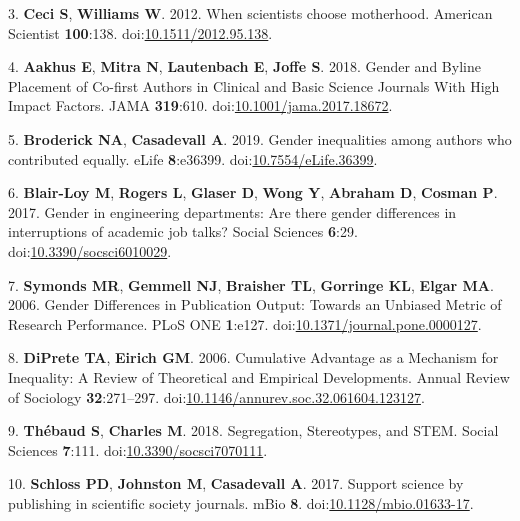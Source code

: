 \documentclass[11pt,]{article}
\begin{document}
\hypertarget{ref-Ceci2012}{}
3. \textbf{Ceci S}, \textbf{Williams W}. 2012. When scientists choose
motherhood. American Scientist \textbf{100}:138.
doi:\href{https://doi.org/10.1511/2012.95.138}{10.1511/2012.95.138}.

\hypertarget{ref-aakhus_gender_2018}{}
4. \textbf{Aakhus E}, \textbf{Mitra N}, \textbf{Lautenbach E},
\textbf{Joffe S}. 2018. Gender and Byline Placement of Co-first Authors
in Clinical and Basic Science Journals With High Impact Factors. JAMA
\textbf{319}:610.
doi:\href{https://doi.org/10.1001/jama.2017.18672}{10.1001/jama.2017.18672}.

\hypertarget{ref-broderick_gender_2019}{}
5. \textbf{Broderick NA}, \textbf{Casadevall A}. 2019. Gender
inequalities among authors who contributed equally. eLife
\textbf{8}:e36399.
doi:\href{https://doi.org/10.7554/eLife.36399}{10.7554/eLife.36399}.

\hypertarget{ref-BlairLoy2017}{}
6. \textbf{Blair-Loy M}, \textbf{Rogers L}, \textbf{Glaser D},
\textbf{Wong Y}, \textbf{Abraham D}, \textbf{Cosman P}. 2017. Gender in
engineering departments: Are there gender differences in interruptions
of academic job talks? Social Sciences \textbf{6}:29.
doi:\href{https://doi.org/10.3390/socsci6010029}{10.3390/socsci6010029}.

\hypertarget{ref-symonds_gender_2006}{}
7. \textbf{Symonds MR}, \textbf{Gemmell NJ}, \textbf{Braisher TL},
\textbf{Gorringe KL}, \textbf{Elgar MA}. 2006. Gender Differences in
Publication Output: Towards an Unbiased Metric of Research Performance.
PLoS ONE \textbf{1}:e127.
doi:\href{https://doi.org/10.1371/journal.pone.0000127}{10.1371/journal.pone.0000127}.

\hypertarget{ref-diprete_cumulative_2006}{}
8. \textbf{DiPrete TA}, \textbf{Eirich GM}. 2006. Cumulative Advantage
as a Mechanism for Inequality: A Review of Theoretical and Empirical
Developments. Annual Review of Sociology \textbf{32}:271--297.
doi:\href{https://doi.org/10.1146/annurev.soc.32.061604.123127}{10.1146/annurev.soc.32.061604.123127}.

\hypertarget{ref-thebaud_segregation_2018}{}
9. \textbf{Thébaud S}, \textbf{Charles M}. 2018. Segregation,
Stereotypes, and STEM. Social Sciences \textbf{7}:111.
doi:\href{https://doi.org/10.3390/socsci7070111}{10.3390/socsci7070111}.

\hypertarget{ref-Schloss2017}{}
10. \textbf{Schloss PD}, \textbf{Johnston M}, \textbf{Casadevall A}.
2017. Support science by publishing in scientific society journals. mBio
\textbf{8}.
doi:\href{https://doi.org/10.1128/mbio.01633-17}{10.1128/mbio.01633-17}.
\end{document}
